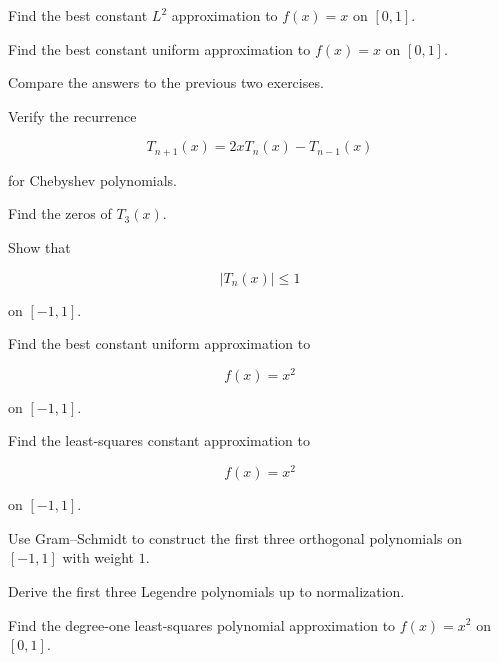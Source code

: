 \begin{exercise}[2]
Find the best constant \(L^2\) approximation to \(f(x)=x\) on
\([0,1]\).
\end{exercise}

\begin{exercise}[2]
Find the best constant uniform approximation to \(f(x)=x\) on
\([0,1]\).
\end{exercise}

\begin{exercise}[2]
Compare the answers to the previous two exercises.
\end{exercise}

\begin{exercise}[2]
Verify the recurrence

\[
T_{n+1}(x)
=
2xT_n(x)-T_{n-1}(x)
\]

for Chebyshev polynomials.
\end{exercise}

\begin{exercise}[2]
Find the zeros of \(T_3(x)\).
\end{exercise}

\begin{exercise}[2]
Show that

\[
|T_n(x)|\leq1
\]

on \([-1,1]\).
\end{exercise}

\begin{exercise}[2]
Find the best constant uniform approximation to

\[
f(x)=x^2
\]

on \([-1,1]\).
\end{exercise}

\begin{exercise}[2]
Find the least-squares constant approximation to

\[
f(x)=x^2
\]

on \([-1,1]\).
\end{exercise}

\begin{exercise}[3]
Use Gram--Schmidt to construct the first three orthogonal polynomials on
\([-1,1]\) with weight \(1\).
\end{exercise}

\begin{exercise}[3]
Derive the first three Legendre polynomials up to normalization.
\end{exercise}

\begin{exercise}[3]
Find the degree-one least-squares polynomial approximation to
\(f(x)=x^2\) on \([0,1]\).
\end{exercise}

